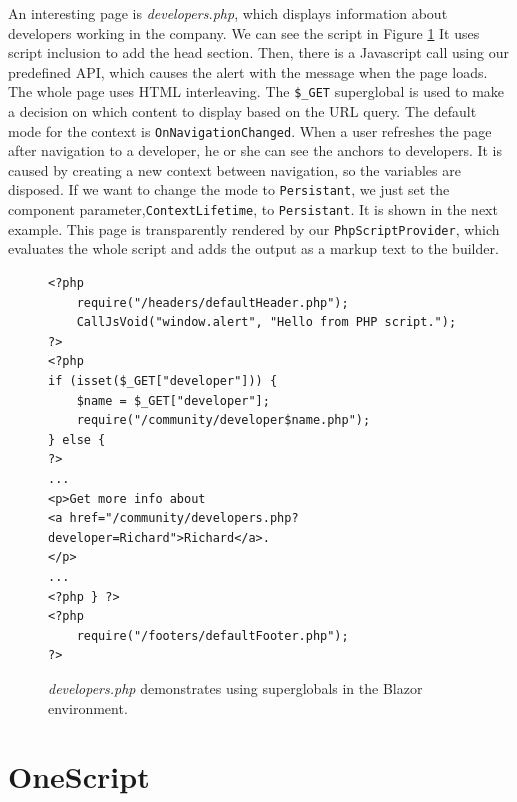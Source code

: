\par
An interesting page is \textit{developers.php}, which displays information about developers working in the company.
We can see the script in Figure \ref{img25:developer}
It uses script inclusion to add the head section.
Then, there is a Javascript call using our predefined API, which causes the alert with the message when the page loads.
The whole page uses HTML interleaving.
The \texttt{\$\_GET} superglobal is used to make a decision on which content to display based on the URL query.
The default mode for the context is \texttt{OnNavigationChanged}.
When a user refreshes the page after navigation to a developer, he or she can see the anchors to developers.
It is caused by creating a new context between navigation, so the variables are disposed.
If we want to change the mode to \texttt{Persistant}, we just set the component parameter,\texttt{ContextLifetime}, to \texttt{Persistant}.
It is shown in the next example.
This page is transparently rendered by our \texttt{PhpScriptProvider}, which evaluates the whole script and adds the output as a markup text to the builder.
\par
\begin{figure}
\begin{lstlisting}
<?php
    require("/headers/defaultHeader.php");
    CallJsVoid("window.alert", "Hello from PHP script.");
?>
<?php
if (isset($_GET["developer"])) { 
    $name = $_GET["developer"];
    require("/community/developer$name.php");
} else {
?>
...
<p>Get more info about 
<a href="/community/developers.php?developer=Richard">Richard</a>.
</p>
...
<?php } ?>
<?php
    require("/footers/defaultFooter.php");
?>
\end{lstlisting}
\caption{\textit{developers.php} demonstrates using superglobals in the Blazor environment.}
\label{img25:developer}
\end{figure}

\section{OneScript}

